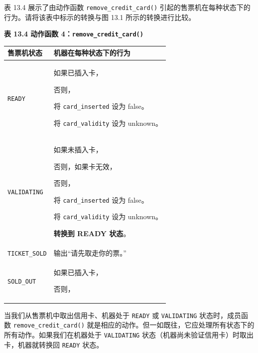 表 13.4 展示了由动作函数 \texttt{remove\_\allowbreak{}credit\_\allowbreak{}card(\allowbreak{})\allowbreak{}} 引起的售票机在每种状态下的行为。请将该表中标示的转换与图 13.1 所示的转换进行比较。

\begin{center}
{\bfseries 表 13.4 动作函数 4：\texttt{remove\_\allowbreak{}credit\_\allowbreak{}card(\allowbreak{})\allowbreak{}}}\par\vspace{3bp}
\begin{tabularx}{\textwidth}{XX}
\toprule
售票机状态 & 机器在每种状态下的行为 \\
\midrule
\texttt{READY} & 如果已插入卡，\par 否则，\par 将 \texttt{card\_\allowbreak{}inserted} 设为 false。\par 将 \texttt{card\_\allowbreak{}validity} 设为 unknown。 \\
\texttt{VALIDATING} & 如果未插入卡，\par 否则，如果卡无效，\par 否则，\par 将 \texttt{card\_\allowbreak{}inserted} 设为 false。\par 将 \texttt{card\_\allowbreak{}validity} 设为 unknown。\par \textbf{转换到 READY 状态}。 \\
\texttt{TICKET\_\allowbreak{}SOLD} & 输出“请先取走你的票。” \\
\texttt{SOLD\_OUT} & 如果已插入卡，\par 否则， \\
\bottomrule
\end{tabularx}
\end{center}

当我们从售票机中取出信用卡、机器处于 \texttt{READY} 或 \texttt{VALIDATING} 状态时，成员函数 \texttt{remove\_\allowbreak{}credit\_\allowbreak{}card(\allowbreak{})\allowbreak{}} 就是相应的动作。但一如既往，它应处理所有状态下的所有动作。如果我们在机器处于 \texttt{VALIDATING} 状态（机器尚未验证信用卡）时取出卡，机器就转换回 \texttt{READY} 状态。

